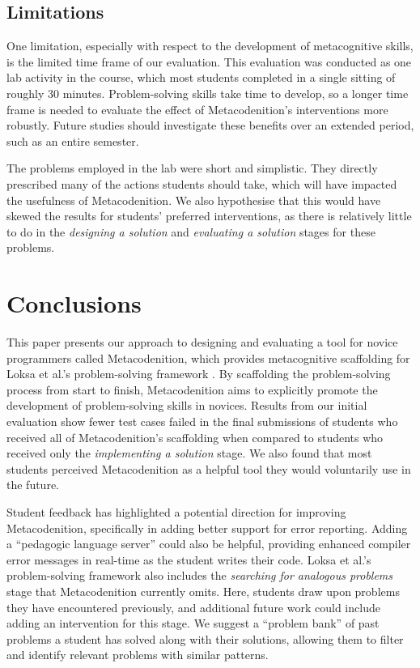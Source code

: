 \documentclass[sigconf,anonymous]{acmart}
\begin{document}
\subsection{Limitations} \label{sec:results-limitations}
One limitation, especially with respect to the development of metacognitive skills, is the limited time frame of our evaluation.  This evaluation was conducted as one lab activity in the course, which most students completed in a single sitting of roughly 30 minutes. Problem-solving skills take time to develop, so a longer time frame is needed to evaluate the effect of Metacodenition's interventions more robustly. Future studies should investigate these benefits over an extended period, such as an entire semester.

The problems employed in the lab were short and simplistic. They directly prescribed many of the actions students should take, which will have impacted the usefulness of Metacodenition. We also hypothesise that this would have skewed the results for students' preferred interventions, as there is relatively little to do in the \emph{designing a solution} and \emph{evaluating a solution} stages for these problems.

\section{Conclusions} \label{sec:conclusion}
This paper presents our approach to designing and evaluating a tool for novice programmers called Metacodenition, which provides metacognitive scaffolding for Loksa et al.'s problem-solving framework \cite{loksa20162}. By scaffolding the problem-solving process from start to finish, Metacodenition aims to explicitly promote the development of problem-solving skills in novices. Results from our initial evaluation show fewer test cases failed in the final submissions of students who received all of Metacodenition's scaffolding when compared to students who received only the \emph{implementing a solution} stage. We also found that most students perceived Metacodenition as a helpful tool they would voluntarily use in the future. 

Student feedback has highlighted a potential direction for improving Metacodenition, specifically in adding better support for error reporting.
Adding a ``pedagogic language server'' could also be helpful, providing enhanced compiler error messages in real-time as the student writes their code. 
Loksa et al.'s problem-solving framework also includes the \emph{searching for analogous problems} stage that Metacodenition currently omits. Here, students draw upon problems they have encountered previously, and additional future work could include adding an intervention for this stage. We suggest a ``problem bank'' of past problems a student has solved along with their solutions, allowing them to filter and identify relevant problems with similar patterns.



\end{document}
